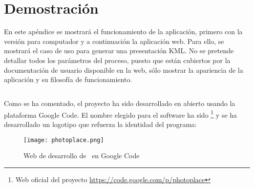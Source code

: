 \chapter[Apéndice]{
  \label{chp:apendice}
  Demostración
}

En este apéndice se mostrará el funcionamiento de la aplicación, primero con
la versión para computador y a continuación la aplicación web. Para ello, se
mostrará el caso de uso para generar una presentación KML. No se
pretende detallar todos los parámetros del proceso, puesto que están cubiertos 
por la documentación de usuario disponible en la web, sólo mostrar la 
apariencia de la aplicación y su filosofía de funcionamiento.

\section{\software}

Como se ha comentado, el proyecto ha sido desarrollado en abierto usando
la plataforma Google Code. El nombre elegido para el software ha sido
\software\footnote{Web oficial del proyecto \url{https://code.google.com/p/photoplace}} 
y se ha desarrollado un logotipo que refuerza la identidad del programa:

\begin{figure}[H]
  \centering
  \texttt{[image: photoplace.png]}
  \caption*{Web de desarrollo de \software\ en Google Code}
  \label{fig:photoplace}
\end{figure}
